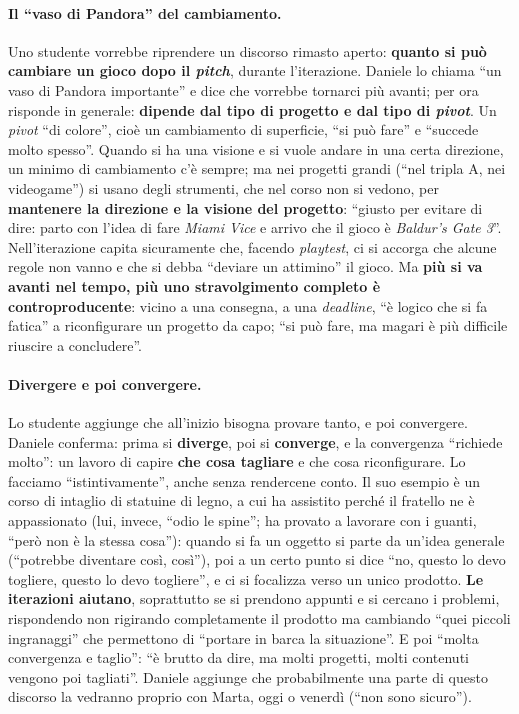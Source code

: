\paragraph{Il ``vaso di Pandora'' del cambiamento.} Uno studente vorrebbe riprendere un
discorso rimasto aperto: \textbf{quanto si può cambiare un gioco dopo il
\emph{pitch}}, durante l'iterazione. Daniele lo chiama ``un vaso di Pandora importante''
e dice che vorrebbe tornarci più avanti; per ora risponde in generale: \textbf{dipende dal
tipo di progetto e dal tipo di \emph{pivot}}. Un \emph{pivot} ``di colore'', cioè un
cambiamento di superficie, ``si può fare'' e ``succede molto spesso''. Quando si ha una
visione e si vuole andare in una certa direzione, un minimo di cambiamento c'è sempre;
ma nei progetti grandi (``nel tripla A, nei videogame'') si usano degli strumenti, che
nel corso non si vedono, per \textbf{mantenere la direzione e la visione del progetto}:
``giusto per evitare di dire: parto con l'idea di fare \emph{Miami Vice} e arrivo che il
gioco è \emph{Baldur's Gate 3}''. Nell'iterazione capita sicuramente che, facendo
\emph{playtest}, ci si accorga che alcune regole non vanno e che si debba ``deviare un
attimino'' il gioco. Ma \textbf{più si va avanti nel tempo, più uno stravolgimento
completo è controproducente}: vicino a una consegna, a una \emph{deadline}, ``è logico che
si fa fatica'' a riconfigurare un progetto da capo; ``si può fare, ma magari è più
difficile riuscire a concludere''.

\paragraph{Divergere e poi convergere.} Lo studente aggiunge che all'inizio bisogna
provare tanto, e poi convergere. Daniele conferma: prima si \textbf{diverge}, poi si
\textbf{converge}, e la convergenza ``richiede molto'': un lavoro di capire \textbf{che
cosa tagliare} e che cosa riconfigurare. Lo facciamo ``istintivamente'', anche senza
rendercene conto. Il suo esempio è un corso di intaglio di statuine di legno, a cui ha
assistito perché il fratello ne è appassionato (lui, invece, ``odio le spine''; ha
provato a lavorare con i guanti, ``però non è la stessa cosa''): quando si fa un oggetto
si parte da un'idea generale (``potrebbe diventare così, così''), poi a un certo punto
si dice ``no, questo lo devo togliere, questo lo devo togliere'', e ci si focalizza verso
un unico prodotto. \textbf{Le iterazioni aiutano}, soprattutto se si prendono appunti e
si cercano i problemi, rispondendo non rigirando completamente il prodotto ma cambiando
``quei piccoli ingranaggi'' che permettono di ``portare in barca la situazione''. E poi
``molta convergenza e taglio'': ``è brutto da dire, ma molti progetti, molti contenuti
vengono poi tagliati''. Daniele aggiunge che probabilmente una parte di questo discorso
la vedranno proprio con Marta, oggi o venerdì (``non sono sicuro'').

